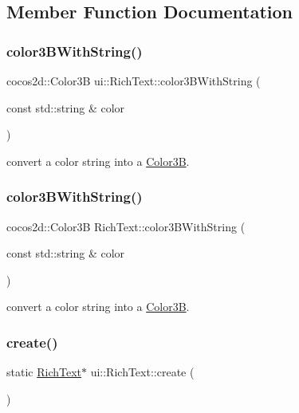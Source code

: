 \subsection{Member Function Documentation}
\mbox{\label{classui_1_1RichText_a1303c59d7cc30d83570ca248b08d09a4}} 
\subsubsection{\texorpdfstring{color3\+B\+With\+String()}{color3BWithString()}\hspace{0.1cm}{\footnotesize\ttfamily [1/2]}}
{\footnotesize\ttfamily cocos2d\+::\+Color3B ui\+::\+Rich\+Text\+::color3\+B\+With\+String (\begin{DoxyParamCaption}\item[{const std\+::string \&}]{color }\end{DoxyParamCaption})}

convert a color string into a \hyperlink{structColor3B}{Color3B}. \mbox{\label{classui_1_1RichText_ad55a7556763a65d5c87e3826f3e8335b}} 
\subsubsection{\texorpdfstring{color3\+B\+With\+String()}{color3BWithString()}\hspace{0.1cm}{\footnotesize\ttfamily [2/2]}}
{\footnotesize\ttfamily cocos2d\+::\+Color3B Rich\+Text\+::color3\+B\+With\+String (\begin{DoxyParamCaption}\item[{const std\+::string \&}]{color }\end{DoxyParamCaption})}

convert a color string into a \hyperlink{structColor3B}{Color3B}. \mbox{\label{classui_1_1RichText_ae4e83215a254608fe6b26aecd224abfa}} 
\subsubsection{\texorpdfstring{create()}{create()}\hspace{0.1cm}{\footnotesize\ttfamily [1/2]}}
{\footnotesize\ttfamily static \hyperlink{classui_1_1RichText}{Rich\+Text}$\ast$ ui\+::\+Rich\+Text\+::create (\begin{DoxyParamCaption}{ }\end{DoxyParamCaption})\hspace{0.3cm}{\ttfamily [static]}}



